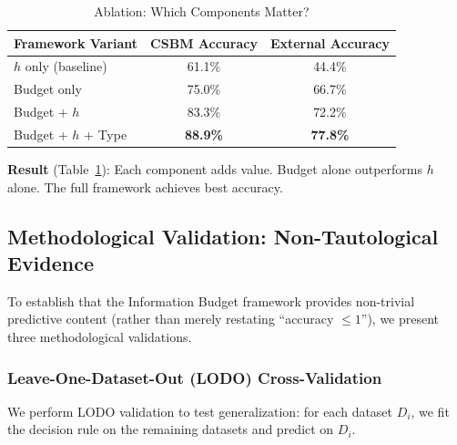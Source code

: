 \begin{table}[t]
\centering
\caption{Ablation: Which Components Matter?}
\label{tab:ablation_framework}
\begin{tabular}{@{}lcc@{}}
\toprule
\textbf{Framework Variant} & \textbf{CSBM Accuracy} & \textbf{External Accuracy} \\
\midrule
$h$ only (baseline) & 61.1\% & 44.4\% \\
Budget only & 75.0\% & 66.7\% \\
Budget + $h$ & 83.3\% & 72.2\% \\
Budget + $h$ + Type & \textbf{88.9\%} & \textbf{77.8\%} \\
\bottomrule
\end{tabular}
\end{table}

\textbf{Result} (Table~\ref{tab:ablation_framework}): Each component adds value. Budget alone outperforms $h$ alone. The full framework achieves best accuracy.

\subsection{Methodological Validation: Non-Tautological Evidence}
\label{sec:methodological_validation}

To establish that the Information Budget framework provides non-trivial predictive content (rather than merely restating ``accuracy $\leq 1$''), we present three methodological validations.

\subsubsection{Leave-One-Dataset-Out (LODO) Cross-Validation}

We perform LODO validation to test generalization: for each dataset $D_i$, we fit the decision rule on the remaining datasets and predict on $D_i$.

